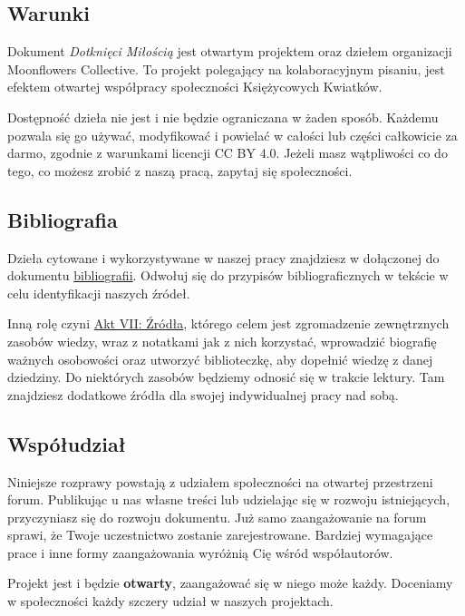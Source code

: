 \begin{multicols}{2}
    \subsection*{Warunki}
    Dokument \emph{Dotknięci Miłością} jest otwartym projektem oraz dziełem organizacji Moonflowers Collective.
    To projekt polegający na kolaboracyjnym pisaniu, jest efektem otwartej współpracy społeczności Księżycowych Kwiatków.

    Dostępność dzieła nie jest i nie będzie ograniczana w żaden sposób.
    Każdemu pozwala się go używać, modyfikować i powielać w całości lub części całkowicie za darmo, zgodnie z warunkami licencji CC BY 4.0.
    Jeżeli masz wątpliwości co do tego, co możesz zrobić z naszą pracą, zapytaj się społeczności.

    \subsection*{Bibliografia}
    Dzieła cytowane i wykorzystywane w naszej pracy znajdziesz w dołączonej do dokumentu \hyperref[zal:bibliografia]{bibliografii}.
    Odwołuj się do przypisów bibliograficznych w tekście w celu identyfikacji naszych źródeł.

    Inną rolę czyni \hyperref[akt:zrodla]{Akt VII: Źródła}, którego celem jest zgromadzenie zewnętrznych zasobów wiedzy,
    wraz z notatkami jak z nich korzystać, wprowadzić biografię ważnych osobowości 
    oraz utworzyć biblioteczkę, aby dopełnić wiedzę z danej dziedziny.
    Do niektórych zasobów będziemy odnosić się w trakcie lektury.
    Tam znajdziesz dodatkowe źródła dla swojej indywidualnej pracy nad sobą.
    \vspace*{-0.8em}

    \columnbreak

    \subsection*{Współudział}
    Niniejsze rozprawy powstają z udziałem społeczności na otwartej przestrzeni forum.
    Publikując u nas własne treści lub udzielając się w rozwoju istniejących, przyczyniasz się do rozwoju dokumentu.
    Już samo zaangażowanie na forum sprawi, że Twoje uczestnictwo zostanie zarejestrowane.
    Bardziej wymagające prace i inne formy zaangażowania wyróżnią Cię wśród współautorów.

    Projekt jest i będzie \textbf{otwarty}, zaangażować się w niego może każdy.
    Doceniamy w społeczności każdy szczery udział w naszych projektach.


\end{multicols}
